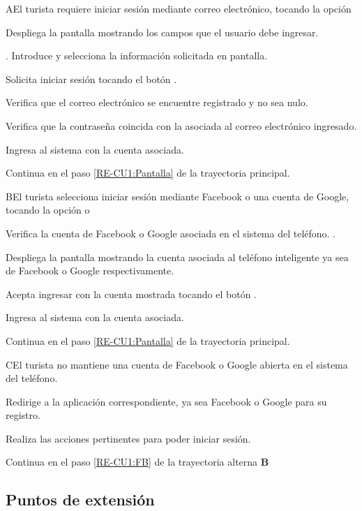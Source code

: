 	\begin{UCtrayectoriaA}{A}{El turista requiere iniciar sesión mediante correo electrónico, tocando la opción }
			
		\UCpaso Despliega la pantalla  mostrando los campos que el usuario debe ingresar.
			
		\UCpaso [\UCactor] \label{RE-CU1:iniciarSesion}. Introduce y selecciona la información solicitada en pantalla.
		
		\UCpaso [\UCactor] Solicita iniciar sesión tocando el botón . 
			
		\UCpaso Verifica que el correo electrónico se encuentre registrado y no sea nulo.  

		\UCpaso Verifica que la contraseña coincida con la asociada al correo electrónico ingresado. 
			
		\UCpaso Ingresa al sistema con la cuenta asociada.
			
		\UCpaso Continua en el paso \ref{RE-CU1:Pantalla} de la trayectoria principal.
			
	\end{UCtrayectoriaA}
		
	\begin{UCtrayectoriaA}{B}{El turista selecciona iniciar sesión mediante Facebook o una cuenta de Google, tocando la opción  o }
		
		\UCpaso Verifica la cuenta de Facebook o Google asociada en el sistema del teléfono. .
				
		\UCpaso \label{RE-CU1:FB} Despliega la pantalla  mostrando la cuenta asociada al teléfono inteligente ya sea de Facebook o Google respectivamente.
			
		\UCpaso [\UCactor] Acepta ingresar con la cuenta mostrada tocando el botón  .
		
		\UCpaso Ingresa al sistema con la cuenta asociada. 
		
		\UCpaso Continua en el paso \ref{RE-CU1:Pantalla} de la trayectoria principal.
		
	\end{UCtrayectoriaA}
	
	\begin{UCtrayectoriaA}{C}{El turista no mantiene una cuenta de Facebook o Google abierta en el sistema del teléfono.}
		
		\UCpaso Redirige a la aplicación correspondiente, ya sea Facebook o Google para su registro.
		
		\UCpaso [\UCactor] Realiza las acciones pertinentes para poder iniciar sesión.
		
		\UCpaso Continua en el paso \ref{RE-CU1:FB} de la trayectoria alterna \textbf{B}
		
	\end{UCtrayectoriaA}


\subsection{Puntos de extensión}
